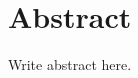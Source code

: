 \documentclass[a4paper,11pt,oneside,openany,fleqn]{jsbook}
\begin{document}
    \chapter*{Abstract}
    Write abstract here.
\end{document}
